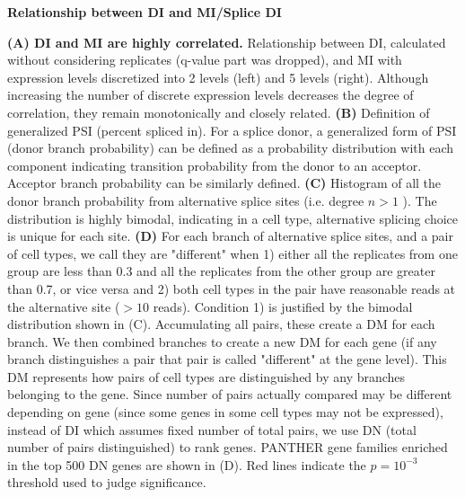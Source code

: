 \textbf{Relationship between DI and MI/Splice DI}

\textbf{(A) DI and MI are highly correlated.} Relationship between DI, calculated without considering replicates (q-value part was dropped), and MI with expression levels discretized into 2 levels (left) and 5 levels (right). Although increasing the number of discrete expression levels decreases the degree of correlation, they remain monotonically and closely related.
\textbf{(B)} Definition of generalized PSI (percent spliced in). For a splice donor, a generalized form of PSI (donor branch probability) can be defined as a probability distribution with each component indicating transition probability from the donor to an acceptor. Acceptor branch probability can be similarly defined. 
\textbf{(C)} Histogram of all the donor branch probability from alternative splice sites (i.e. degree $n > 1$ ). The distribution is highly bimodal, indicating in a cell type, alternative splicing choice is unique for each site. 
\textbf{(D)} For each branch of alternative splice sites, and a pair of cell types, we call they are "different" when 1) either all the replicates from one group are less than 0.3 and all the replicates from the other group are greater than 0.7, or vice versa and 2) both cell types in the pair have reasonable reads at the alternative site ($>10$ reads). Condition 1) is justified by the bimodal distribution shown in (C). Accumulating all pairs, these create a DM for each branch. We then combined branches to create a new DM for each gene (if any branch distinguishes a pair that pair is called "different" at the gene level). This DM represents how pairs of cell types are distinguished by any branches belonging to the gene. Since number of pairs actually compared may be different depending on gene (since some genes in some cell types may not be expressed), instead of DI which assumes fixed number of total pairs, we use DN (total number of pairs distinguished) to rank genes. PANTHER gene families enriched in the top 500 DN genes are shown in (D). Red lines indicate the $p=10^{-3}$ threshold used to judge significance.
